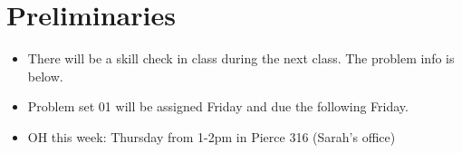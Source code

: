 \documentclass[12pt,letterpaper,noanswers]{exam}
\newcommand{\note}[1]{} %
\begin{document}
 \pdfpageheight 11in 
  \pdfpagewidth 8.5in

\noindent 

\note{calendar:
\begin{enumerate}
    \item Tu intro PS01
    \item Th binary PS01
    \item Tu condition number PS01/2
    \item Th least sq PS02
    \item Tu lin alg PS02/3
    \item Th lin alg PS03
    \item Tu least sq PS03/4
    \item Th ?? PS04
    \item Tu root finding PS04/5
    \item Th root finding PS05 (early)
    \item Tu integration PS06
    \item Th quiz
    \item Tu interpolation PS06
    \item Th interpolation PS06
    \item Tu integration PS07
    \item Th Monte Carlo PS07
    \item Tu differentiation PS08
    \item Th differentiation PS08
    \item Tu diff eq
    \item Th application of diff eq
    \item Tu ODEs
    \item Th ODEs
    \item Tu neural nets
    \item Tu neural nets
    \item Th quiz
    \item Tu presentations
\end{enumerate}}

\note{
\begin{itemize}
    \item what is a floating point system
    \item example
    \item IDing info about a floating point system
    \item 
\end{itemize}
}
\setcounter{section}{-1}
\section{Preliminaries}
\begin{itemize}
\itemsep0pt
\item There will be a skill check in class during the next class.  The problem info is below.
\item Problem set 01 will be assigned Friday and due the following Friday.
\item OH this week: Thursday from 1-2pm in Pierce 316 (Sarah's office)
\end{itemize}
\end{document}
